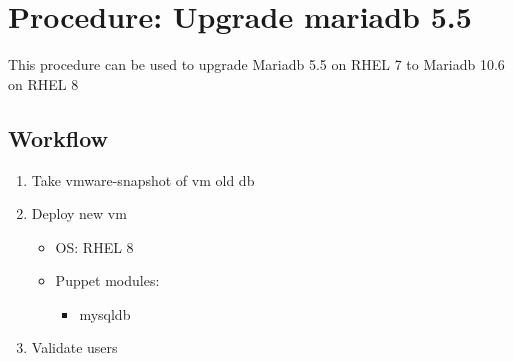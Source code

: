 
\section{Procedure: Upgrade mariadb 5.5}
This procedure can be used to upgrade Mariadb 5.5 on RHEL 7 to Mariadb 10.6 on RHEL 8

\subsection{Workflow}

\begin{enumerate}
    \item Take vmware-snapshot of vm old db
    \item Deploy new vm
    \begin{itemize}
        \item OS: RHEL 8
        \item Puppet modules:
            \begin{itemize}
            \item mysqldb
        \end{itemize}
    \end{itemize}
    \item Validate users
\end{enumerate}